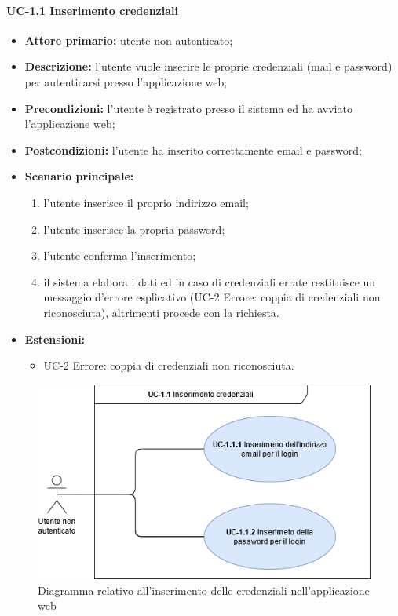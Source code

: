   \paragraph{UC-1.1 Inserimento credenziali}
  \begin{itemize}
    \item \textbf{Attore primario:} utente non autenticato;
  
    \item \textbf{Descrizione:} l'utente vuole inserire le proprie credenziali (mail e password) per autenticarsi presso l'applicazione web;
  
    \item \textbf{Precondizioni:} l'utente è registrato presso il sistema ed ha avviato l'applicazione web;
  
    \item \textbf{Postcondizioni:} l'utente ha inserito correttamente email e password;
  
    \item \textbf{Scenario principale:}
          \begin{enumerate}
            \item l'utente inserisce il proprio indirizzo email;
            \item l'utente inserisce la propria password;
            \item l'utente conferma l'inserimento;
            \item il sistema elabora i dati ed in caso di credenziali errate restituisce un messaggio d'errore esplicativo (UC-2 Errore: coppia di credenziali non riconosciuta), altrimenti procede con la richiesta.
          \end{enumerate}
    \item \textbf{Estensioni:}
      \begin{itemize}
            \item UC-2 Errore: coppia di credenziali non riconosciuta.
          \end{itemize}
  \end{itemize}
  
\begin{figure}[H]
    \centering
      \includegraphics[scale=0.50]{src/CasiDUso/immagini/InserimentoCredenzialiWeb.png}
    \caption{Diagramma relativo all'inserimento delle credenziali nell'applicazione web}
\end{figure}
  
